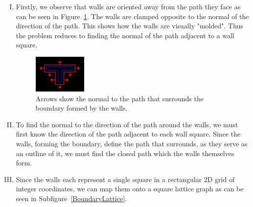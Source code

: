 \documentclass[a4paper,12pt]{article}
\begin{document}
\begin{enumerate}[I.]
\item Firstly, we observe that walls are oriented away from the path they face as can be seen in Figure~\ref{PathNormal}. The walls are clamped opposite to the normal of the direction of the path. This shows how the walls are visually "molded". Thus the problem reduces to finding the normal of the path adjacent to a wall square.  
\begin{figure}[H]
	\centering
	\includegraphics[width=0.4\linewidth]{Image-6.png}
	\caption {Arrows show the normal to the path that surrounds the boundary formed by the walls.} \label{PathNormal}
\end{figure}

\item To find the normal to the direction of the path around the walls, we must first know the direction of the path adjacent to each wall square. Since the walls, forming the boundary, define the path that surrounds, as they serve as an outline of it, we must find the closed path which the walls themselves form.\label{ClosedPathObservation}

\item Since the walls each represent a single square in a rectangular 2D grid of integer coordinates, we can map them onto a square lattice graph as can be seen in Subfigure~\ref{BoundaryLattice}.\label{SquareLatticeObservation}


\end{enumerate}
\end{document}
